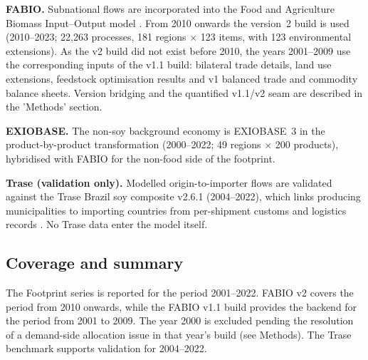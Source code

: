 \documentclass[pdflatex,sn-nature]{sn-jnl}%
\begin{document}
\textbf{FABIO.} Subnational flows are incorporated into the Food and Agriculture
Biomass Input--Output model \cite{bruckner2019fabio}. From 2010 onwards the
version~2 build is used (2010--2023; 22{,}263 processes, 181 regions
$\times$ 123 items, with 123 environmental extensions). As the v2 build did not exist before 2010, the years 2001–2009 use the corresponding inputs of the v1.1 build: bilateral trade details, land use extensions, feedstock optimisation results and v1 balanced trade and commodity balance sheets. Version bridging and the quantified v1.1/v2 seam are described in the 'Methods' section.

\textbf{EXIOBASE.} The non-soy background economy is EXIOBASE~3
\cite{stadler2018exiobase} in the product-by-product transformation
(2000--2022; 49 regions $\times$ 200 products), hybridised with FABIO for
the non-food side of the footprint.

\textbf{Trase (validation only).} Modelled origin-to-importer flows are
validated against the Trase Brazil soy composite v2.6.1 (2004--2022), which
links producing municipalities to importing countries from per-shipment
customs and logistics records \cite{godar2015sei,escobar2020trase}. No
Trase data enter the model itself.

\subsection{Coverage and summary}\label{subsec:coverage}

The Footprint series is reported for the period 2001–2022. FABIO v2 covers the period from 2010 onwards, while the FABIO v1.1 build provides the backend for the period from 2001 to 2009. The year 2000 is excluded pending the resolution of a demand-side allocation issue in that year's build (see Methods). The Trase benchmark supports validation for 2004–2022.
\end{document}
